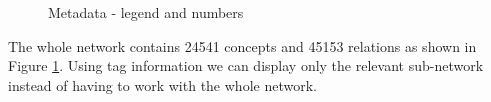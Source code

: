 \begin{figure}[H]
\centering
{}
\label{fig:metadata_pathways}
\caption{Metadata - legend and numbers}
\end{figure}
The whole network contains 24541 concepts and 45153 relations as shown in Figure \ref{fig:metadata_pathways}. 
Using tag information we can display only the relevant sub-network instead of having to work with the whole network.

